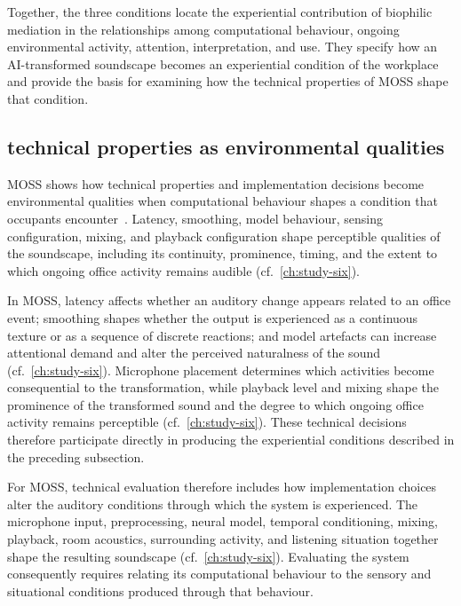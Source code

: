Together, the three conditions locate the experiential contribution of biophilic mediation in the relationships among computational behaviour, ongoing environmental activity, attention, interpretation, and use. They specify how an AI-transformed soundscape becomes an experiential condition of the workplace and provide the basis for examining how the technical properties of MOSS shape that condition.


\subsection{technical properties as environmental qualities}
\label{subsec:technical-experiential}

MOSS shows how technical properties and implementation decisions become environmental qualities when computational behaviour shapes a condition that occupants encounter~\cite{alavi2018artifacts,alavi2019introduction,wiberg2020interaction}. Latency, smoothing, model behaviour, sensing configuration, mixing, and playback configuration shape perceptible qualities of the soundscape, including its continuity, prominence, timing, and the extent to which ongoing office activity remains audible (cf.~\autoref{ch:study-six}).


In MOSS, latency affects whether an auditory change appears related to an office event; smoothing shapes whether the output is experienced as a continuous texture or as a sequence of discrete reactions; and model artefacts can increase attentional demand and alter the perceived naturalness of the sound (cf.~\autoref{ch:study-six}). Microphone placement determines which activities become consequential to the transformation, while playback level and mixing shape the prominence of the transformed sound and the degree to which ongoing office activity remains perceptible (cf.~\autoref{ch:study-six}). These technical decisions therefore participate directly in producing the experiential conditions described in the preceding subsection.

For MOSS, technical evaluation therefore includes how implementation choices alter the auditory conditions through which the system is experienced. The microphone input, preprocessing, neural model, temporal conditioning, mixing, playback, room acoustics, surrounding activity, and listening situation together shape the resulting soundscape (cf.~\autoref{ch:study-six}). Evaluating the system consequently requires relating its computational behaviour to the sensory and situational conditions produced through that behaviour.

